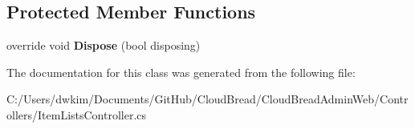 \subsection*{Protected Member Functions}
\begin{DoxyCompactItemize}
\item 
override void {\bfseries Dispose} (bool disposing)\hypertarget{class_cloud_bread_admin_web_1_1_controllers_1_1_item_lists_controller_a3b733cdefccc9047fd17210711465992}{}\label{class_cloud_bread_admin_web_1_1_controllers_1_1_item_lists_controller_a3b733cdefccc9047fd17210711465992}

\end{DoxyCompactItemize}


The documentation for this class was generated from the following file\+:\begin{DoxyCompactItemize}
\item 
C\+:/\+Users/dwkim/\+Documents/\+Git\+Hub/\+Cloud\+Bread/\+Cloud\+Bread\+Admin\+Web/\+Controllers/Item\+Lists\+Controller.\+cs\end{DoxyCompactItemize}

